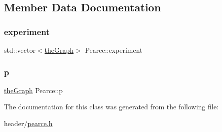 \subsection{Member Data Documentation}
\mbox{\label{class_pearce_ad33eb33876fe817143afb84583934313}} 
\subsubsection{\texorpdfstring{experiment}{experiment}}
{\footnotesize\ttfamily std\+::vector$<$\hyperlink{class_graph_component_a982e0748a6e1b8dc74986f5f8b3dca5c}{the\+Graph}$>$ Pearce\+::experiment}

\mbox{\label{class_pearce_a2320928312fd97f6bcb1f16684f79a03}} 
\subsubsection{\texorpdfstring{p}{p}}
{\footnotesize\ttfamily \hyperlink{class_graph_component_a982e0748a6e1b8dc74986f5f8b3dca5c}{the\+Graph} Pearce\+::p}



The documentation for this class was generated from the following file\+:\begin{DoxyCompactItemize}
\item 
header/\hyperlink{pearce_8h}{pearce.\+h}\end{DoxyCompactItemize}
